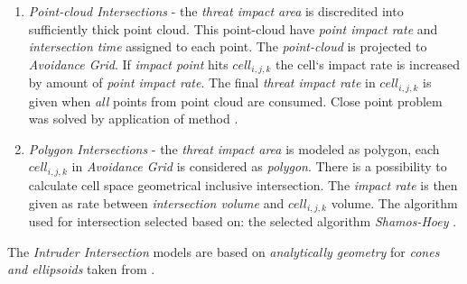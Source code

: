 \begin{enumerate}
    \item\emph{Point-cloud Intersections} - the \emph{threat impact area} is discredited into sufficiently thick point cloud. This point-cloud have \emph{point impact rate} and \emph{intersection time} assigned to each point. The \emph{point-cloud} is projected to \emph{Avoidance Grid}. If \emph{impact point} hits $cell_{i,j,k}$ the cell`s impact rate is increased by amount of \emph{point impact rate}. The final \emph{threat impact rate} in $cell_{i,j,k}$ is given when \emph{all} points from point cloud are consumed. Close point problem \cite{shamos1975closest} was solved by application of method  \cite{bentley1980optimal}.
    
    \item\emph{Polygon Intersections} - the \emph{threat impact area} is modeled as polygon, each $cell_{i,j,k}$ in \emph{Avoidance Grid} is considered as \emph{polygon}. There is a possibility to calculate cell space geometrical inclusive intersection. The \emph{impact rate} is then given as rate between \emph{intersection volume} and $cell_{i,j,k}$ volume. The algorithm used for intersection selected based on:\citep{bentley1979algorithms} the selected algorithm  \emph{Shamos-Hoey} \cite{shamos1976geometric}.
\end{enumerate}

\begin{note}
    The \emph{Intruder Intersection} models are based on \emph{analytically geometry} for \emph{cones and ellipsoids} taken from \cite{sommerville2016analytical}.
\end{note}
